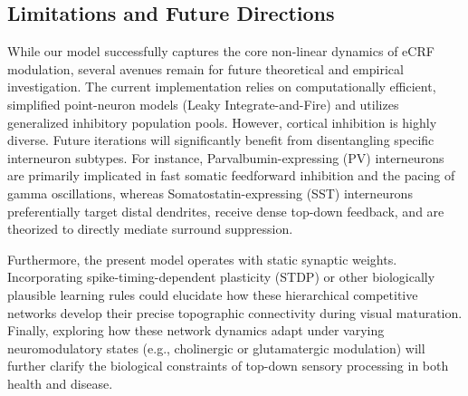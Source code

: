 \subsection{Limitations and Future Directions}
While our model successfully captures the core non-linear dynamics of eCRF modulation, several avenues remain for future theoretical and empirical investigation. The current implementation relies on computationally efficient, simplified point-neuron models (Leaky Integrate-and-Fire) and utilizes generalized inhibitory population pools. However, cortical inhibition is highly diverse. Future iterations will significantly benefit from disentangling specific interneuron subtypes. For instance, Parvalbumin-expressing (PV) interneurons are primarily implicated in fast somatic feedforward inhibition and the pacing of gamma oscillations, whereas Somatostatin-expressing (SST) interneurons preferentially target distal dendrites, receive dense top-down feedback, and are theorized to directly mediate surround suppression. 

Furthermore, the present model operates with static synaptic weights. Incorporating spike-timing-dependent plasticity (STDP) or other biologically plausible learning rules could elucidate how these hierarchical competitive networks develop their precise topographic connectivity during visual maturation. Finally, exploring how these network dynamics adapt under varying neuromodulatory states (e.g., cholinergic or glutamatergic modulation) will further clarify the biological constraints of top-down sensory processing in both health and disease.